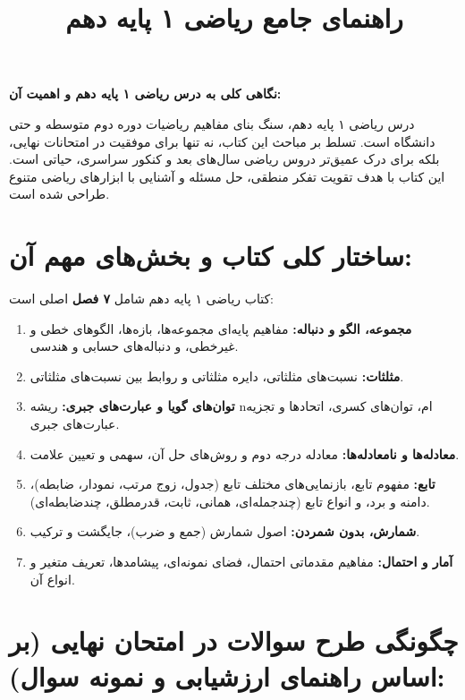 \documentclass[12pt,a4paper]{article}
\title{راهنمای جامع ریاضی ۱ پایه دهم}
\author{} %
\date{} %
\begin{document}
\maketitle
\begin{center}
\textbf{نگاهی کلی به درس ریاضی ۱ پایه دهم و اهمیت آن:}
\end{center}

درس ریاضی ۱ پایه دهم، سنگ بنای مفاهیم ریاضیات دوره دوم متوسطه و حتی دانشگاه است. تسلط بر مباحث این کتاب، نه تنها برای موفقیت در امتحانات نهایی، بلکه برای درک عمیق‌تر دروس ریاضی سال‌های بعد و کنکور سراسری، حیاتی است. این کتاب با هدف تقویت تفکر منطقی، حل مسئله و آشنایی با ابزارهای ریاضی متنوع طراحی شده است.

\section*{ساختار کلی کتاب و بخش‌های مهم آن:}

کتاب ریاضی ۱ پایه دهم شامل \textbf{۷ فصل} اصلی است:

\begin{enumerate}[label=\textbf{فصل \arabic*:}, wide, labelindent=0pt]
    \item \textbf{مجموعه، الگو و دنباله:} مفاهیم پایه‌ای مجموعه‌ها، بازه‌ها، الگوهای خطی و غیرخطی، و دنباله‌های حسابی و هندسی.
    \item \textbf{مثلثات:} نسبت‌های مثلثاتی، دایره مثلثاتی و روابط بین نسبت‌های مثلثاتی.
    \item \textbf{توان‌های گویا و عبارت‌های جبری:} ریشه nام، توان‌های کسری، اتحادها و تجزیه عبارت‌های جبری.
    \item \textbf{معادله‌ها و نامعادله‌ها:} معادله درجه دوم و روش‌های حل آن، سهمی و تعیین علامت.
    \item \textbf{تابع:} مفهوم تابع، بازنمایی‌های مختلف تابع (جدول، زوج مرتب، نمودار، ضابطه)، دامنه و برد، و انواع تابع (چندجمله‌ای، همانی، ثابت، قدرمطلق، چندضابطه‌ای).
    \item \textbf{شمارش، بدون شمردن:} اصول شمارش (جمع و ضرب)، جایگشت و ترکیب.
    \item \textbf{آمار و احتمال:} مفاهیم مقدماتی احتمال، فضای نمونه‌ای، پیشامدها، تعریف متغیر و انواع آن.
\end{enumerate}

\section*{چگونگی طرح سوالات در امتحان نهایی (بر اساس راهنمای ارزشیابی و نمونه سوال):}
\end{document}
